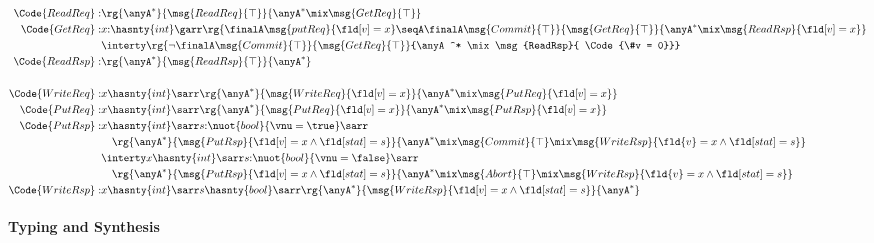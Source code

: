 {\footnotesize\begin{align*}
    \Code{ReadReq}:& \rg{\anyA^*}{\msg{ReadReq}{\top}}{\anyA^* \mix \msg{GetReq}{\top}}
    \\\Code{GetReq}:&  x{:}\hasnty{int}\garr\rg{\finalA \msg{putReq}{\fld[v] = x} \seqA \finalA \msg{Commit}{\top}}{\msg{GetReq}{\top}}{\anyA^* \mix \msg{ReadRsp}{ \fld[v] = x}}
    \\&\interty  \rg{\neg\finalA \msg{Commit}{\top}}{\msg{GetReq}{\top}}{\anyA^* \mix \msg{ReadRsp}{ \Code{\#v = 0}}}
    \\\Code{ReadRsp}:& \rg{\anyA^*}{\msg{ReadRsp}{\top}}{\anyA^*}
    \\
    \\\Code{WriteReq}:&  x\hasnty{int} \sarr \rg{\anyA^*}{\msg{WriteReq}{\fld[v] = x}}{\anyA^* \mix \msg{PutReq}{\fld[v] = x}}
    \\\Code{PutReq}:&  x\hasnty{int} \sarr \rg{\anyA^*}{\msg{PutReq}{\fld[v] = x}}{\anyA^* \mix \msg{PutRsp}{\fld[v] = x} }
    \\\Code{PutRsp}:&  x\hasnty{int} \sarr s{:}\nuot{bool}{\vnu = \true} \sarr 
    \\&\quad \rg{\anyA^*}{\msg{PutRsp}{\fld[v] = x \land \fld[stat] = s}}{\anyA^* \mix \msg{Commit}{\top} \mix \msg{WriteRsp}{\fld{v} = x \land \fld[stat] = s}}
    \\&  \interty x\hasnty{int} \sarr s{:}\nuot{bool}{\vnu = \false} \sarr 
    \\&\quad \rg{\anyA^*}{\msg{PutRsp}{\fld[v] = x \land \fld[stat] = s}}{\anyA^* \mix \msg{Abort}{\top} \mix \msg{WriteRsp}{\fld{v} = x \land \fld[stat] = s}}
    \\\Code{WriteRsp}:& x\hasnty{int} \sarr s\hasnty{bool} \sarr \rg{\anyA^*}{\msg{WriteRsp}{\fld[v] = x \land \fld[stat] = s}}{\anyA^*}
\end{align*}}

\paragraph{Typing and Synthesis}

